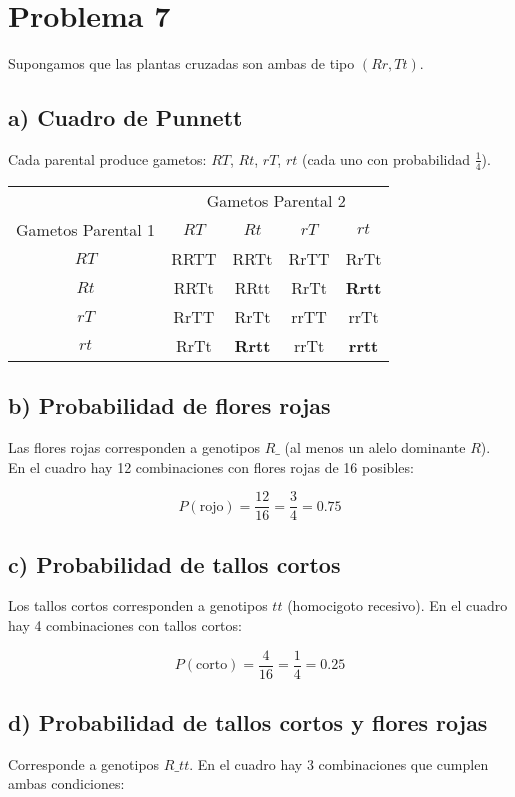 \documentclass{article}
\begin{document}
	\section*{Problema 7}
	Supongamos que las plantas cruzadas son ambas de tipo \( (Rr, Tt) \).
	
	\subsection*{a) Cuadro de Punnett}
	Cada parental produce gametos: \( RT \), \( Rt \), \( rT \), \( rt \) (cada uno con probabilidad \( \frac{1}{4} \)).
	
	\vspace{0.5cm}
	\begin{tabular}{c|cccc}
		\toprule
		& \multicolumn{4}{c}{Gametos Parental 2} \\
		\cmidrule(lr){2-5}
		Gametos Parental 1 & \( RT \) & \( Rt \) & \( rT \) & \( rt \) \\
		\midrule
		\( RT \) & RRTT & RRTt & RrTT & RrTt \\
		\( Rt \) & RRTt & RRtt & RrTt & \textbf{Rrtt} \\
		\( rT \) & RrTT & RrTt & rrTT & rrTt \\
		\( rt \) & RrTt & \textbf{Rrtt} & rrTt & \textbf{rrtt} \\
		\bottomrule
	\end{tabular}
	
	\subsection*{b) Probabilidad de flores rojas}
	Las flores rojas corresponden a genotipos \( R\_ \) (al menos un alelo dominante \( R \)). En el cuadro hay 12 combinaciones con flores rojas de 16 posibles:
	
	\[
	P(\text{rojo}) = \frac{12}{16} = \frac{3}{4} = 0.75
	\]
	
	\subsection*{c) Probabilidad de tallos cortos}
	Los tallos cortos corresponden a genotipos \( tt \) (homocigoto recesivo). En el cuadro hay 4 combinaciones con tallos cortos:
	
	\[
	P(\text{corto}) = \frac{4}{16} = \frac{1}{4} = 0.25
	\]
	
	\subsection*{d) Probabilidad de tallos cortos y flores rojas}
	Corresponde a genotipos \( R\_ tt \). En el cuadro hay 3 combinaciones que cumplen ambas condiciones:
	
\end{document}
